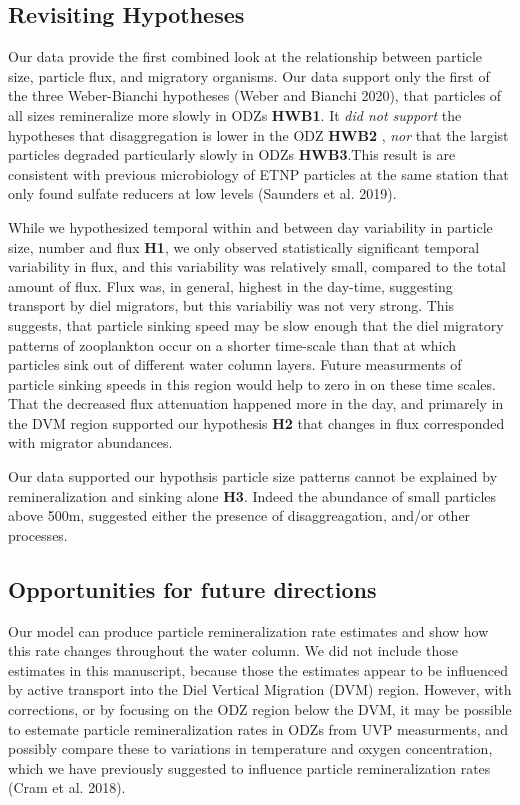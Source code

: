 \documentclass[]{article}
\begin{document}
\hypertarget{revisiting-hypotheses}{%
\subsection{Revisiting Hypotheses}\label{revisiting-hypotheses}}

Our data provide the first combined look at the relationship between
particle size, particle flux, and migratory organisms. Our data support
only the first of the three Weber-Bianchi hypotheses (Weber and Bianchi
2020), that particles of all sizes remineralize more slowly in ODZs
\textbf{HWB1}. It \emph{did not support} the hypotheses that
disaggregation is lower in the ODZ \textbf{HWB2} , \emph{nor} that the
largist particles degraded particularly slowly in ODZs
\textbf{HWB3}.This result is are consistent with previous microbiology
of ETNP particles at the same station that only found sulfate reducers
at low levels (Saunders et al. 2019).

While we hypothesized temporal within and between day variability in
particle size, number and flux \textbf{H1}, we only observed
statistically significant temporal variability in flux, and this
variability was relatively small, compared to the total amount of flux.
Flux was, in general, highest in the day-time, suggesting transport by
diel migrators, but this variabiliy was not very strong. This suggests,
that particle sinking speed may be slow enough that the diel migratory
patterns of zooplankton occur on a shorter time-scale than that at which
particles sink out of different water column layers. Future measurments
of particle sinking speeds in this region would help to zero in on these
time scales. That the decreased flux attenuation happened more in the
day, and primarely in the DVM region supported our hypothesis
\textbf{H2} that changes in flux corresponded with migrator abundances.

Our data supported our hypothsis particle size patterns cannot be
explained by remineralization and sinking alone \textbf{H3}. Indeed the
abundance of small particles above 500m, suggested either the presence
of disaggreagation, and/or other processes.

\hypertarget{opportunities-for-future-directions}{%
\subsection{Opportunities for future
directions}\label{opportunities-for-future-directions}}

Our model can produce particle remineralization rate estimates and show
how this rate changes throughout the water column. We did not include
those estimates in this manuscript, because those the estimates appear
to be influenced by active transport into the Diel Vertical Migration
(DVM) region. However, with corrections, or by focusing on the ODZ
region below the DVM, it may be possible to estemate particle
remineralization rates in ODZs from UVP measurments, and possibly
compare these to variations in temperature and oxygen concentration,
which we have previously suggested to influence particle
remineralization rates (Cram et al. 2018).
\end{document}
